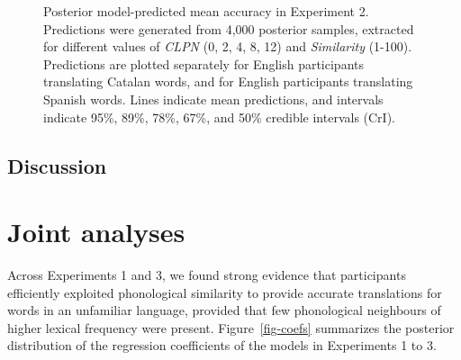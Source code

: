 \documentclass[
]{article}
\begin{document}
\begin{figure}


\caption{\label{fig-epreds-3}Posterior model-predicted mean accuracy in
Experiment 2. Predictions were generated from 4,000 posterior samples,
extracted for different values of \emph{CLPN} (0, 2, 4, 8, 12) and
\emph{Similarity} (1-100). Predictions are plotted separately for
English participants translating Catalan words, and for English
participants translating Spanish words. Lines indicate mean predictions,
and intervals indicate 95\%, 89\%, 78\%, 67\%, and 50\% credible
intervals (CrI).}

\end{figure}%

\subsection{Discussion}\label{discussion-2}

\section{Joint analyses}\label{joint-analyses}

Across Experiments 1 and 3, we found strong evidence that participants
efficiently exploited phonological similarity to provide accurate
translations for words in an unfamiliar language, provided that few
phonological neighbours of higher lexical frequency were present.
Figure~\ref{fig-coefs} summarizes the posterior distribution of the
regression coefficients of the models in Experiments 1 to 3.
\end{document}

